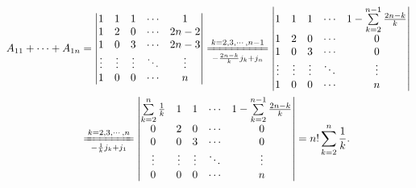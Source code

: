 \documentclass[../../main.tex]{subfiles}%
\begin{document}
\begin{solution}
\begin{align*}
A_{11} + \cdots + A_{1n} &= \begin{vmatrix}
1 & 1 & 1 & \cdots & 1 \\
1 & 2 & 0 & \cdots & 2n-2 \\
1 & 0 & 3 & \cdots & 2n-3 \\
\vdots & \vdots & \vdots & \ddots & \vdots \\
1 & 0 & 0 & \cdots & n
\end{vmatrix} 
\xlongequal[-\frac{2n-k}{k}j_k + j_n]{k=2,3,\cdots,n-1}
\begin{vmatrix}
1 & 1 & 1 & \cdots & 1-\sum\limits_{k=2}^{n-1}\frac{2n-k}{k} \\
1 & 2 & 0 & \cdots & 0 \\
1 & 0 & 3 & \cdots & 0 \\
\vdots & \vdots & \vdots & \ddots & \vdots \\
1 & 0 & 0 & \cdots & n
\end{vmatrix} \\
&\xlongequal[-\frac{1}{k}j_k + j_1]{k=2,3,\cdots,n}
\begin{vmatrix}
\sum\limits_{k=2}^{n}\frac{1}{k} & 1 & 1 & \cdots & 1-\sum\limits_{k=2}^{n-1}\frac{2n-k}{k} \\
0 & 2 & 0 & \cdots & 0 \\
0 & 0 & 3 & \cdots & 0 \\
\vdots & \vdots & \vdots & \ddots & \vdots \\
0 & 0 & 0 & \cdots & n
\end{vmatrix} = n! \sum\limits_{k=2}^{n}\frac{1}{k}.
\end{align*}
\end{solution}
\end{document}
